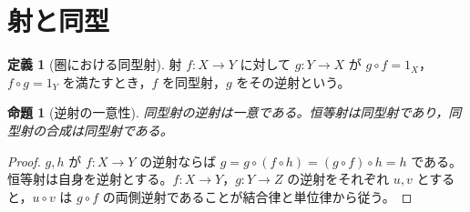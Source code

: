 \documentclass[a5paper,10pt,dvipdfmx]{jsarticle}
\theoremstyle{definition}
\newtheorem{defn}[ruledef]{定義}
\theoremstyle{plain}
\newtheorem{prop}[ruledef]{命題}
\begin{document}
\section{射と同型}
\begin{defn}[圏における同型射]\label{k243}
射 $f:X\to Y$ に対して $g:Y\to X$ が $g\circ f=1_X$，$f\circ g=1_Y$ を満たすとき，$f$ を同型射，$g$ をその逆射という。
\end{defn}
\begin{prop}[逆射の一意性]\label{k244}
同型射の逆射は一意である。恒等射は同型射であり，同型射の合成は同型射である。
\end{prop}
\begin{proof}
$g,h$ が $f:X\to Y$ の逆射ならば $g=g\circ(f\circ h)=(g\circ f)\circ h=h$ である。恒等射は自身を逆射とする。$f:X\to Y$，$g:Y\to Z$ の逆射をそれぞれ $u,v$ とすると，$u\circ v$ は $g\circ f$ の両側逆射であることが結合律と単位律から従う。
\end{proof}
\end{document}
